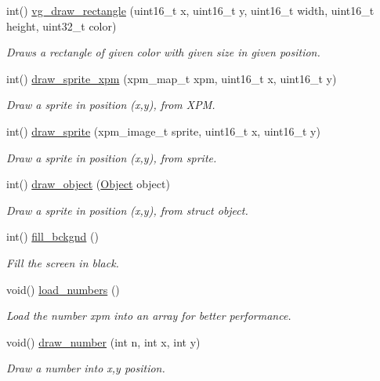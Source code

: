 \begin{DoxyCompactItemize}
int() \hyperlink{group__graphics_ga99d2da2559e11200c6b40c469e9977ec}{vg\+\_\+draw\+\_\+rectangle} (uint16\+\_\+t x, uint16\+\_\+t y, uint16\+\_\+t width, uint16\+\_\+t height, uint32\+\_\+t color)
\begin{DoxyCompactList}\small\item\em Draws a rectangle of given color with given size in given position. \end{DoxyCompactList}\item 
int() \hyperlink{group__graphics_gaf7d28831f1ffad3816101e473a54b9be}{draw\+\_\+sprite\+\_\+xpm} (xpm\+\_\+map\+\_\+t xpm, uint16\+\_\+t x, uint16\+\_\+t y)
\begin{DoxyCompactList}\small\item\em Draw a sprite in position (x,y), from X\+PM. \end{DoxyCompactList}\item 
int() \hyperlink{group__graphics_ga7f31f56ddc44fb5e02130bbe4a6c3927}{draw\+\_\+sprite} (xpm\+\_\+image\+\_\+t sprite, uint16\+\_\+t x, uint16\+\_\+t y)
\begin{DoxyCompactList}\small\item\em Draw a sprite in position (x,y), from sprite. \end{DoxyCompactList}\item 
int() \hyperlink{group__graphics_ga08b3cc962ee64800e139310f91a3d4b4}{draw\+\_\+object} (\hyperlink{structObject}{Object} object)
\begin{DoxyCompactList}\small\item\em Draw a sprite in position (x,y), from struct object. \end{DoxyCompactList}\item 
int() \hyperlink{group__graphics_ga97ef658560a953fdb5a8ac8310b31516}{fill\+\_\+bckgnd} ()
\begin{DoxyCompactList}\small\item\em Fill the screen in black. \end{DoxyCompactList}\item 
void() \hyperlink{group__graphics_gad93c2188e33c696ab1697dc05b320131}{load\+\_\+numbers} ()
\begin{DoxyCompactList}\small\item\em Load the number xpm into an array for better performance. \end{DoxyCompactList}\item 
void() \hyperlink{group__graphics_ga7b24da519204bf650a1e98c993093e94}{draw\+\_\+number} (int n, int x, int y)
\begin{DoxyCompactList}\small\item\em Draw a number into x,y position. \end{DoxyCompactList}\item 

\end{DoxyCompactItemize}
